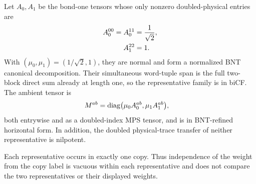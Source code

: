 \begin{lemma}
    \label{thm:mpdo_caseii_absorption_algebraic_data}
    \leanok
    Let $A_0,A_1$ be the bond-one tensors whose only nonzero doubled-physical
    entries are
    \begin{align}
        A_0^{00}=A_0^{11} & =\frac1{\sqrt2}, \notag \\
        A_1^{22}          & =1. \notag
    \end{align}
    With $(\mu_0,\mu_1)=(1/\sqrt2,1)$, they are normal and form a normalized
    BNT canonical decomposition. Their simultaneous word-tuple span is the
    full two-block direct sum already at length one, so the representative
    family is in biCF. The ambient tensor is
    \begin{align}
        M^{ab} & =\operatorname{diag}
        \bigl(\mu_0A_0^{ab},\mu_1A_1^{ab}\bigr), \notag
    \end{align}
    both entrywise and as a doubled-index MPS tensor, and is in
    BNT-refined horizontal form. In addition, the doubled physical-trace
    transfer of neither representative is nilpotent.

    Each representative occurs in exactly one copy. Thus independence of the
    weight from the copy label is vacuous within each representative and does
    not compare the two representatives or their displayed weights.
\end{lemma}

